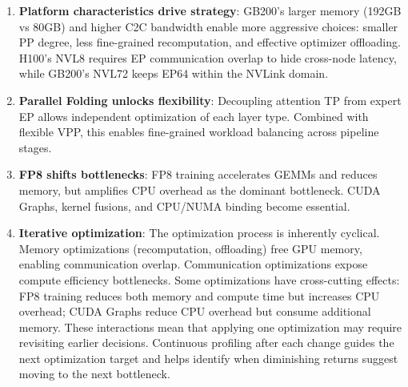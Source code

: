 \begin{enumerate}
    \item \textbf{Platform characteristics drive strategy}: GB200's larger memory (192GB vs 80GB) and higher C2C bandwidth enable more aggressive choices: smaller PP degree, less fine-grained recomputation, and effective optimizer offloading. H100's NVL8 requires EP communication overlap to hide cross-node latency, while GB200's NVL72 keeps EP64 within the NVLink domain.
    \item \textbf{Parallel Folding unlocks flexibility}: Decoupling attention TP from expert EP allows independent optimization of each layer type. Combined with flexible VPP, this enables fine-grained workload balancing across pipeline stages.
    \item \textbf{FP8 shifts bottlenecks}: FP8 training accelerates GEMMs and reduces memory, but amplifies CPU overhead as the dominant bottleneck. CUDA Graphs, kernel fusions, and CPU/NUMA binding become essential.
    \item \textbf{Iterative optimization}: The optimization process is inherently cyclical. Memory optimizations (recomputation, offloading) free GPU memory, enabling communication overlap. Communication optimizations expose compute efficiency bottlenecks. Some optimizations have cross-cutting effects: FP8 training reduces both memory and compute time but increases CPU overhead; CUDA Graphs reduce CPU overhead but consume additional memory. These interactions mean that applying one optimization may require revisiting earlier decisions. Continuous profiling after each change guides the next optimization target and helps identify when diminishing returns suggest moving to the next bottleneck.
\end{enumerate}

